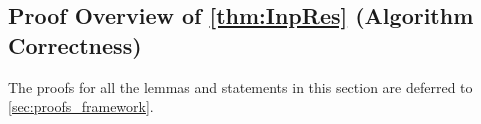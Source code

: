 %
%



\subsection{Proof Overview of \cref{thm:InpRes} (Algorithm Correctness)} \label{sec:algoCorrectness}
The proofs for all the lemmas and statements in this section are deferred to \cref{sec:proofs_framework}.

